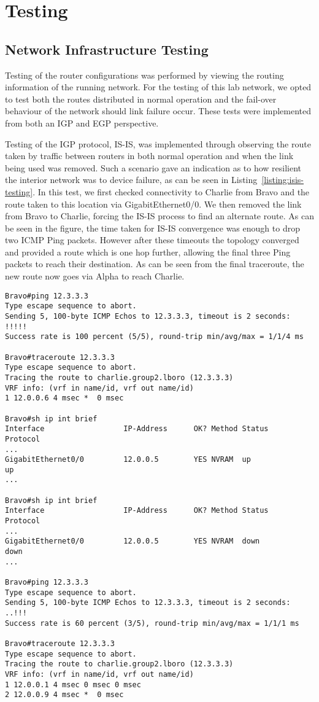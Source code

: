 \chapter{Testing}
\section{Network Infrastructure Testing}
Testing of the router configurations was performed by viewing the routing
information of the running network. For the testing of this lab network, we
opted to test both the routes distributed in normal operation and the fail-over
behaviour of the network should link failure occur. These tests were
implemented from both an IGP and EGP perspective.

Testing of the IGP protocol, IS-IS, was implemented through observing the route
taken by traffic between routers in both normal operation and when the link
being used was removed. Such a scenario gave an indication as to how resilient
the interior network was to device failure, as can be seen in
Listing~\ref{listing:isis-testing}. In this test, we first checked connectivity
to Charlie from Bravo and the route taken to this location via GigabitEthernet0/0. We then
removed the link from Bravo to Charlie, forcing the IS-IS process to find an
alternate route. As can be seen in the figure, the time taken for IS-IS
convergence was enough to drop two ICMP Ping packets. However after these
timeouts the topology converged and provided a route which is one hop further,
allowing the final three Ping packets to reach their destination. As can be
seen from the final traceroute, the new route now goes via Alpha to reach
Charlie.

\begin{lstlisting}[caption={Testing of IS-IS reaction to link failure}, label={listing:isis-testing}]
Bravo#ping 12.3.3.3
Type escape sequence to abort.
Sending 5, 100-byte ICMP Echos to 12.3.3.3, timeout is 2 seconds:
!!!!!
Success rate is 100 percent (5/5), round-trip min/avg/max = 1/1/4 ms

Bravo#traceroute 12.3.3.3
Type escape sequence to abort.
Tracing the route to charlie.group2.lboro (12.3.3.3)
VRF info: (vrf in name/id, vrf out name/id)
1 12.0.0.6 4 msec *  0 msec

Bravo#sh ip int brief
Interface                  IP-Address      OK? Method Status                Protocol
...
GigabitEthernet0/0         12.0.0.5        YES NVRAM  up                    up
...

Bravo#sh ip int brief
Interface                  IP-Address      OK? Method Status                Protocol
...
GigabitEthernet0/0         12.0.0.5        YES NVRAM  down                  down
...

Bravo#ping 12.3.3.3
Type escape sequence to abort.
Sending 5, 100-byte ICMP Echos to 12.3.3.3, timeout is 2 seconds:
..!!!
Success rate is 60 percent (3/5), round-trip min/avg/max = 1/1/1 ms

Bravo#traceroute 12.3.3.3
Type escape sequence to abort.
Tracing the route to charlie.group2.lboro (12.3.3.3)
VRF info: (vrf in name/id, vrf out name/id)
1 12.0.0.1 4 msec 0 msec 0 msec
2 12.0.0.9 4 msec *  0 msec
\end{lstlisting}


